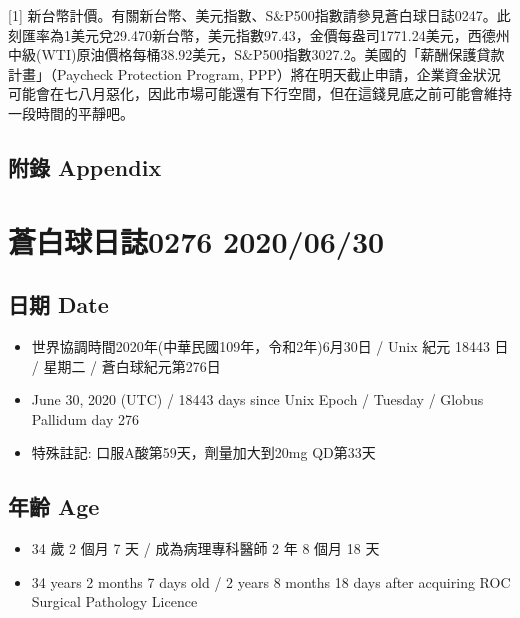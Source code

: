 \documentclass[a5paper, 11pt
]{book}
\providecommand{\tightlist}{%
  \setlength{\itemsep}{0pt}\setlength{\parskip}{0pt}}
\begin{document}
{[}1{]}
新台幣計價。有關新台幣、美元指數、S\&P500指數請參見蒼白球日誌0247。此刻匯率為1美元兌29.470新台幣，美元指數97.43，金價每盎司1771.24美元，西德州中級(WTI)原油價格每桶38.92美元，S\&P500指數3027.2。美國的「薪酬保護貸款計畫」（Paycheck
Protection Program,
PPP）將在明天截止申請，企業資金狀況可能會在七八月惡化，因此市場可能還有下行空間，但在這錢見底之前可能會維持一段時間的平靜吧。

\hypertarget{ux9644ux9304-appendix-24}{%
\subsection{附錄 Appendix}\label{ux9644ux9304-appendix-24}}

\hypertarget{ux84bcux767dux7403ux65e5ux8a8c0276-20200630}{%
\section{蒼白球日誌0276
2020/06/30}\label{ux84bcux767dux7403ux65e5ux8a8c0276-20200630}}

\hypertarget{ux65e5ux671f-date-25}{%
\subsection{日期 Date}\label{ux65e5ux671f-date-25}}

\begin{itemize}
\tightlist
\item
  世界協調時間2020年(中華民國109年，令和2年)6月30日 / Unix 紀元 18443 日
  / 星期二 / 蒼白球紀元第276日
\item
  June 30, 2020 (UTC) / 18443 days since Unix Epoch / Tuesday / Globus
  Pallidum day 276
\item
  特殊註記: 口服A酸第59天，劑量加大到20mg QD第33天
\end{itemize}

\hypertarget{ux5e74ux9f61-age-25}{%
\subsection{年齡 Age}\label{ux5e74ux9f61-age-25}}

\begin{itemize}
\tightlist
\item
  34 歲 2 個月 7 天 / 成為病理專科醫師 2 年 8 個月 18 天
\item
  34 years 2 months 7 days old / 2 years 8 months 18 days after
  acquiring ROC Surgical Pathology Licence
\end{itemize}
\end{document}
